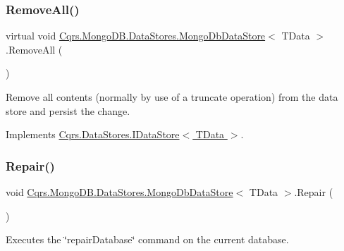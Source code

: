 \subsubsection{\texorpdfstring{Remove\+All()}{RemoveAll()}}
{\footnotesize\ttfamily virtual void \hyperlink{classCqrs_1_1MongoDB_1_1DataStores_1_1MongoDbDataStore}{Cqrs.\+Mongo\+D\+B.\+Data\+Stores.\+Mongo\+Db\+Data\+Store}$<$ T\+Data $>$.Remove\+All (\begin{DoxyParamCaption}{ }\end{DoxyParamCaption})\hspace{0.3cm}{\ttfamily [virtual]}}



Remove all contents (normally by use of a truncate operation) from the data store and persist the change. 



Implements \hyperlink{interfaceCqrs_1_1DataStores_1_1IDataStore_aead8d7a39a717d29af05daf7b64bea94_aead8d7a39a717d29af05daf7b64bea94}{Cqrs.\+Data\+Stores.\+I\+Data\+Store$<$ T\+Data $>$}.

\mbox{\label{classCqrs_1_1MongoDB_1_1DataStores_1_1MongoDbDataStore_a2fef1856a801d2f247ed5b0a0f3bea9a_a2fef1856a801d2f247ed5b0a0f3bea9a}} 
\subsubsection{\texorpdfstring{Repair()}{Repair()}}
{\footnotesize\ttfamily void \hyperlink{classCqrs_1_1MongoDB_1_1DataStores_1_1MongoDbDataStore}{Cqrs.\+Mongo\+D\+B.\+Data\+Stores.\+Mongo\+Db\+Data\+Store}$<$ T\+Data $>$.Repair (\begin{DoxyParamCaption}{ }\end{DoxyParamCaption})}



Executes the \char`\"{}repair\+Database\char`\"{} command on the current database. 

\mbox{\label{classCqrs_1_1MongoDB_1_1DataStores_1_1MongoDbDataStore_af86a3df56e2df92fb9ef880ff4fa5f16_af86a3df56e2df92fb9ef880ff4fa5f16}} 
